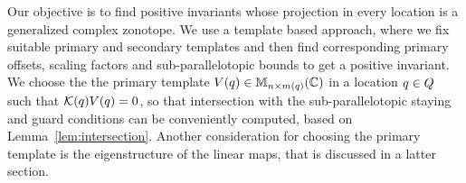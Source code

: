 
Our objective is to find positive invariants whose projection in every
location is a generalized complex zonotope.  We use a template based
approach, where we fix suitable primary and secondary templates and
then find corresponding primary offsets, scaling factors and
sub-parallelotopic bounds to get a positive invariant.  We choose the
the primary template $V(q)\in\mathbb{M}_{n\times m(q)}(\mathbb{\mathbb{C}})$ in a
location $q\in Q$ such
that
$\mathcal{K}(q)V(q) = 0$,
so that intersection with the sub-parallelotopic staying and guard
conditions can be conveniently computed, based on
Lemma~\ref{lem:intersection}.  Another consideration for choosing the
primary template is the eigenstructure of the linear
maps, that is discussed in a latter section.



